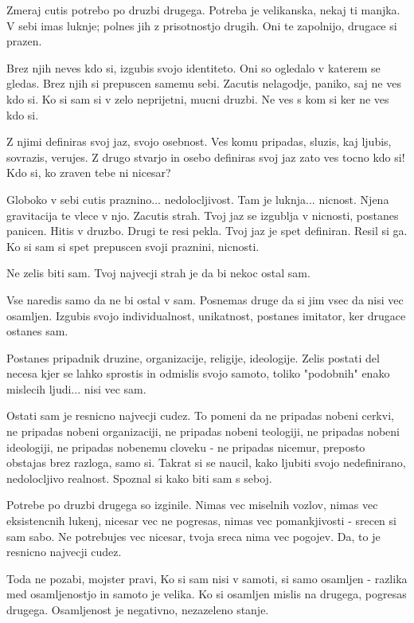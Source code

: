        

   Zmeraj cutis potrebo po druzbi drugega. Potreba je velikanska, nekaj ti manjka. V sebi imas luknje; polnes jih z prisotnostjo drugih. Oni te zapolnijo, drugace si prazen. 

Brez njih neves kdo si, izgubis svojo identiteto. Oni so ogledalo v katerem se gledas. Brez njih si prepuscen samemu sebi. Zacutis nelagodje, paniko, saj ne ves kdo si. Ko si sam si v zelo neprijetni, mucni druzbi. Ne ves s kom si ker ne ves kdo si. 

Z njimi definiras svoj jaz, svojo osebnost. Ves komu pripadas, sluzis, kaj ljubis, sovrazis, verujes. Z drugo stvarjo in osebo definiras svoj jaz zato ves tocno kdo si! Kdo si, ko zraven tebe ni nicesar? 

Globoko v sebi cutis praznino... nedolocljivost. Tam je luknja... nicnost. Njena gravitacija te vlece v njo. Zacutis strah. Tvoj jaz se izgublja v nicnosti, postanes panicen. Hitis v druzbo. Drugi te resi pekla. Tvoj jaz je spet definiran. Resil si ga. Ko si sam si spet prepuscen svoji praznini, nicnosti. 

Ne zelis biti sam. Tvoj najvecji strah je da bi nekoc ostal sam. 

Vse naredis samo da ne bi ostal v sam. Posnemas druge da si jim vsec da nisi vec osamljen. Izgubis svojo individualnost, unikatnost, postanes imitator, ker drugace ostanes sam. 

Postanes pripadnik druzine, organizacije, religije, ideologije. Zelis postati del necesa kjer se lahko sprostis in odmislis svojo samoto, toliko "podobnih" enako mislecih ljudi... nisi vec sam. 

Ostati sam je resnicno najvecji cudez. To pomeni da ne pripadas nobeni cerkvi, ne pripadas nobeni organizaciji, ne pripadas nobeni teologiji, ne pripadas nobeni ideologiji, ne pripadas nobenemu cloveku - ne pripadas nicemur, preposto obstajas brez razloga, samo si. Takrat si se naucil, kako ljubiti svojo nedefinirano, nedolocljivo realnost. Spoznal si kako biti sam s seboj. 

Potrebe po druzbi drugega so izginile. Nimas vec miselnih vozlov, nimas vec eksistencnih lukenj, nicesar vec ne pogresas, nimas vec pomankjivosti - srecen si sam sabo. Ne potrebujes vec nicesar, tvoja sreca nima vec pogojev. Da, to je resnicno najvecji cudez. 

Toda ne pozabi, mojster pravi,  Ko si sam nisi v samoti, si samo osamljen - razlika med osamljenostjo in samoto je velika. Ko si osamljen mislis na drugega, pogresas drugega. Osamljenost je negativno, nezazeleno stanje. 

